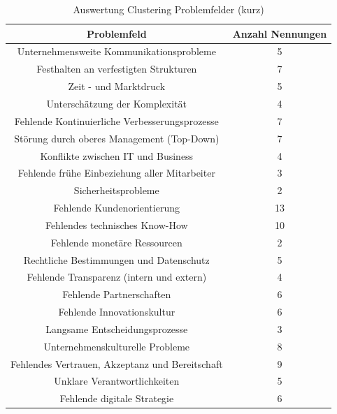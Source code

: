 \begin{table}[ht]
	\centering
	\caption{Auswertung Clustering Problemfelder (kurz)}
	\begin{tabular}{|c|c|}
		\hline
		\textbf{Problemfeld}& \textbf{Anzahl Nennungen} \\
		\hline
		Unternehmensweite Kommunikationsprobleme        & 5  \\
		Festhalten an verfestigten Strukturen           & 7  \\
		Zeit - und Marktdruck                           & 5  \\
		Unterschätzung der Komplexität                  & 4  \\
		Fehlende Kontinuierliche Verbesserungsprozesse  & 7  \\
		Störung durch oberes Management (Top-Down)      & 7  \\
		Konflikte zwischen IT und Business              & 4  \\
		Fehlende frühe Einbeziehung aller Mitarbeiter   & 3  \\
		Sicherheitsprobleme                             & 2  \\
		Fehlende Kundenorientierung                     & 13 \\
		Fehlendes technisches Know-How                  & 10 \\
		Fehlende monetäre Ressourcen                    & 2  \\
		Rechtliche Bestimmungen und Datenschutz         & 5  \\
		Fehlende Transparenz (intern und extern)        & 4  \\
		Fehlende Partnerschaften                        & 6  \\
		Fehlende Innovationskultur                      & 6  \\
		Langsame Entscheidungsprozesse                  & 3  \\
		Unternehmenskulturelle Probleme                 & 8  \\
		Fehlendes Vertrauen, Akzeptanz und Bereitschaft & 9  \\
		Unklare Verantwortlichkeiten                    & 5  \\
		Fehlende digitale Strategie                     & 6 \\
		\hline
	\end{tabular}
	\label{tab:clusteringpfshort}
\end{table}


